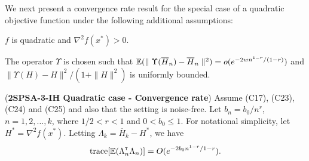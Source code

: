 We next present a convergence rate result for the special case of a quadratic objective function under the following additional assumptions:
\begin{pvn}
\item  $f$ is quadratic and $\nabla^2 f(x^*) > 0$. 
\item The operator $\Upsilon$ is chosen such that $\mathbb{E}(\parallel \Upsilon(\overline H_n) - \overline H_n\parallel^2) = o(e^{-2wn^{1-r}/(1-r)})$ and $\parallel \Upsilon(H) - H \parallel^2 / (1+\parallel H \parallel^2)$ is uniformly bounded.
\end{pvn}
\begin{theorem}(\textbf{2SPSA-3-IH Quadratic case - Convergence rate})
\label{thm:spsaquad-bound}
Assume (C17), (C23), (C24) and (C25) and also that the setting is noise-free. 
Let $b_n = b_0/n^r$, $n=1,2,\ldots,k$, where $1/2 < r < 1$ and $0 < b_0 \leq 1$. For notational simplicity, let $H^*=\nabla^2 f(x^*)$. Letting $\Lambda_k = \overline H_k - H^*$, we have 
\begin{align}
\text{trace}[\mathbb{E} (\Lambda_n ^\mathsf{\scriptscriptstyle T} \Lambda_n)] = O(e^{-2b_0n^{1-r} / {1-r}}).
\label{eq:spsaquad-bigo}
\end{align}
\end{theorem}
